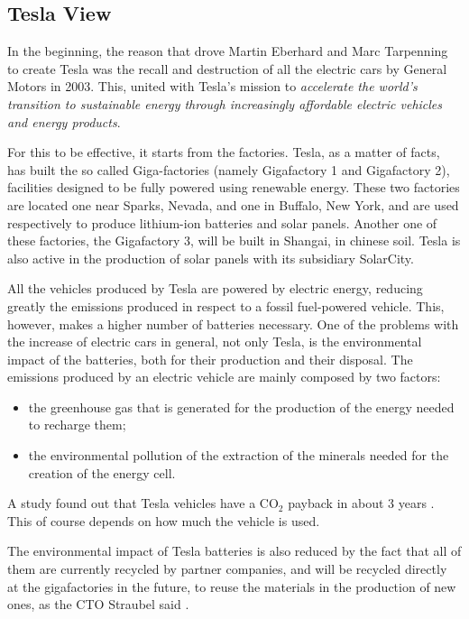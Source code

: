 \subsection{Tesla View}

In the beginning, the reason that drove Martin Eberhard and Marc Tarpenning to create Tesla was the recall and destruction of all the electric cars by General Motors\cite{muskGM} in 2003. This, united with Tesla's mission to \emph{accelerate the world’s transition to sustainable energy through increasingly affordable electric vehicles and energy products}\cite{aboutTesla}.

For this to be effective, it starts from the factories. Tesla, as a matter of facts, has built the so called Giga-factories (namely Gigafactory 1 and Gigafactory 2), facilities designed to be fully powered using renewable energy. These two factories are located one near Sparks, Nevada, and one in Buffalo, New York, and are used respectively to produce lithium-ion batteries and solar panels.
Another one of these factories, the Gigafactory 3, will be built in Shangai, in chinese soil. 
Tesla is also active in the production of solar panels with its subsidiary SolarCity.

All the vehicles produced by Tesla are powered by electric energy, reducing greatly the emissions produced in respect to a fossil fuel-powered vehicle. This, however, makes a higher number of batteries necessary. 
One of the problems with the increase of electric cars in general, not only Tesla, is the environmental impact of the batteries, both for their production and their disposal. 
The emissions produced by an electric vehicle are mainly composed by two factors:
\begin{itemize}
    \item the greenhouse gas that is generated for the production of the energy needed to recharge them;
    \item the environmental pollution of the extraction of the minerals needed for the creation of the energy cell\cite{scheele2016cobalt}.
\end{itemize}
 A study found out that Tesla vehicles have a CO$_2$ payback in about 3 years \cite{electricStudy}. This of course depends on how much the vehicle is used. 

The environmental impact of Tesla batteries is also reduced by the fact that all of them are currently recycled by partner companies, and will be recycled directly at the gigafactories in the future, to reuse the materials in the production of new ones, as the CTO Straubel said \cite{recycleBattery}.




